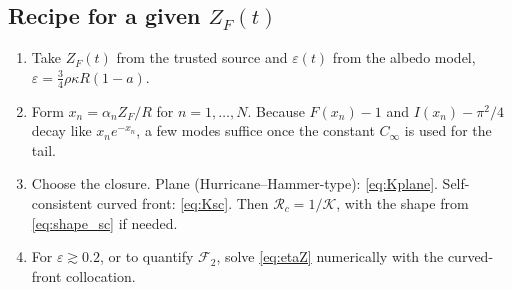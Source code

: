 \documentclass[11pt]{article}
\numberwithin{equation}{section}
\begin{document}
\subsection{\texorpdfstring{Recipe for a given $Z_F(t)$}{Recipe for a given ZF(t)}}
\begin{enumerate}
\item Take $Z_F(t)$ from the trusted source and $\varepsilon(t)$ from the albedo model, $\varepsilon=\tfrac34\rho\kappa R(1-a)$.
\item Form $x_n=\alpha_nZ_F/R$ for $n=1,\dots,N$. Because $F(x_n)-1$ and $I(x_n)-\pi^2/4$ decay like $x_ne^{-x_n}$, a few modes suffice once the constant $C_\infty$ is used for the tail.
\item Choose the closure. Plane (Hurricane--Hammer-type): \eqref{eq:Kplane}. Self-consistent curved front: \eqref{eq:Ksc}. Then $\mathcal R_c=1/\mathcal K$, with the shape from \eqref{eq:shape_sc} if needed.
\item For $\varepsilon\gtrsim0.2$, or to quantify $\mathcal F_2$, solve \eqref{eq:etaZ} numerically with the curved-front collocation.
\end{enumerate}
\end{document}
